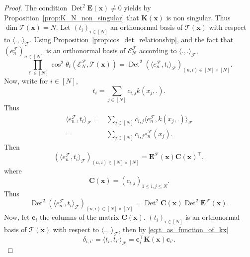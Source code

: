 \documentclass[twoside,11pt]{book}
\numberwithin{theorem}{chapter}
\numberwithin{definition}{chapter}
\numberwithin{proposition}{chapter}
\numberwithin{corollary}{chapter}
\numberwithin{example}{chapter}
\numberwithin{lemma}{chapter}
\DeclareMathOperator{\Det}{Det}
\DeclareMathOperator{\Tran}{\intercal}
\begin{document}
\begin{proof}
The condition $\Det^{2} \bm{E}(\bm{x}) \neq 0$ yields by Proposition~\ref{prop:K_N_non_singular} that $\bm{K}(\bm{x})$ is non singular. Thus $\dim \mathcal{T}(\bm{x}) = N$. Let $(t_{i})_{i \in [N]}$ an orthonormal basis of $\mathcal{T}(\bm{x})$ with respect to $\langle ., . \rangle_{\mathcal{F}}$.
%
Using Proposition~\ref{prop:cos_det_relationship}, and the fact that $(e_{n}^{\mathcal{F}})_{n \in [N]}$ is an orthonormal basis of $\mathcal{E}^{\mathcal{F}}_{N}$ according to $\langle ., . \rangle_{\mathcal{F}}$,
\begin{equation}\label{eq:prod_cos_det_E}
\prod\limits_{\ell \in [N]} \cos^{2} \theta_{\ell} \left(\mathcal{E}^{\mathcal{F}}_{N}, \mathcal{T}(\bm{x}) \right) = \Det^{2} (\langle e_{n}^{\mathcal{F}}, t_{i} \rangle_{\mathcal{F}})_{(n,i) \in [N]\times[N]}.
\end{equation}
Now, write for $i \in [N]$,
\begin{equation}\label{eq:t_as_function_of_kx}
t_{i} = \sum\limits_{j \in [N]} c_{i,j} k(x_{j},.).
\end{equation}
%
Thus
\begin{align}
\langle e_{n}^{\mathcal{F}}, t_{i} \rangle_{\mathcal{F}} = & \sum\limits_{j \in [N]} c_{i,j} \langle e_{n}^{\mathcal{F}}, k(x_{j},.) \rangle_{\mathcal{F}} \\
= &\sum\limits_{j \in [N]} c_{i,j}  e_{n}^{\mathcal{F}}(x_{j}).
\end{align}
%
Then
\begin{equation}
(\langle e_{n}^{\mathcal{F}}, t_{i} \rangle_{\mathcal{F}})_{(n,i) \in [N]\times[N]} = \bm{E}^{\mathcal{F}}(\bm{x}) \bm{C}(\bm{x})^{\Tran} ,
\end{equation}
where
\begin{equation}
\bm{C}(\bm{x}) = (c_{i,j})_{1 \leq i,j \leq N}.
\end{equation}
%
Thus
\begin{equation}\label{eq:AN_times_EN}
\Det^{2} (\langle e_{n}^{\mathcal{F}}, t_{i} \rangle_{\mathcal{F}})_{(n,i) \in [N]\times[N]} = \Det^{2} \bm{C}(\bm{x}) \Det^{2} \bm{E}^{\mathcal{F}}(\bm{x}).
\end{equation}
Now, let $\bm{c}_{i}$ the columns of the matrix $\bm{C}(\bm{x})$. $(t_{i})_{i \in [N]}$ is an orthonormal basis of $\mathcal{T}(\bm{x})$ with respect to $\langle .,. \rangle_{\mathcal{F}}$, then by \eqref{eq:t_as_function_of_kx}
\begin{equation}
  \delta_{i,i'} = \langle t_{i}, t_{i'} \rangle_{\mathcal{F}} = \bm{c}_{i}^{\Tran} \bm{K}(\bm{x}) \bm{c}_{i'}  .

\end{equation}
\end{proof}
\end{document}
